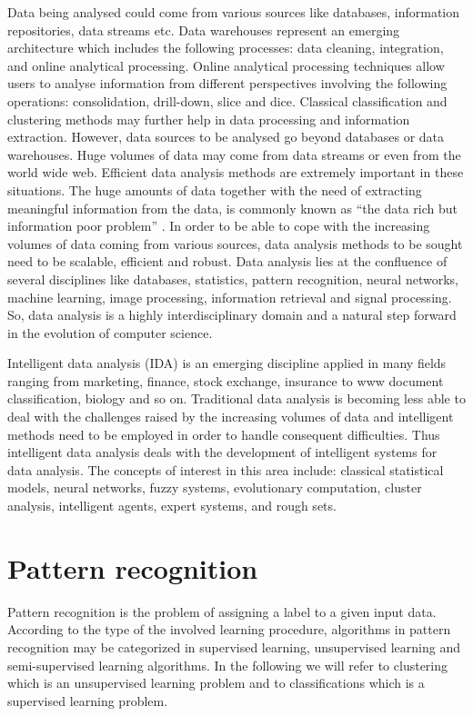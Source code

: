 Data being analysed could come from various sources like databases, information repositories, data streams etc. Data warehouses represent an emerging architecture which includes the following processes: data cleaning, integration, and online analytical processing. 
Online analytical processing techniques allow users to analyse information from different perspectives involving the following operations: consolidation, drill-down, slice and dice. Classical classification and clustering methods may further help in data processing and information extraction. 
However, data sources to be analysed go beyond databases or data warehouses. Huge volumes of data may come from data streams or even from the world wide web. Efficient data analysis methods are extremely important in these situations. The huge amounts of data together with the need of extracting meaningful information from the data, is commonly known as ``the data rich  but information poor problem'' \cite{Han06DataMining}. In order to be able to cope with the increasing volumes of data coming from various sources, data analysis methods to be sought need to be scalable, efficient and robust. Data analysis lies at the confluence of several disciplines like databases, statistics, pattern recognition, neural networks, machine learning, image processing, information retrieval and signal processing. So, data analysis is a highly interdisciplinary domain and a natural step forward in the evolution of computer science. 

Intelligent data analysis (IDA) is an emerging discipline applied in many fields \cite{website:clustering,Han06DataMining, Gaceanu11Using} ranging from  marketing, finance, stock exchange, insurance to www document classification, biology and so on. 
Traditional data analysis is becoming less able to deal with the challenges raised by the increasing volumes of data and intelligent methods need to be employed in order to handle consequent difficulties. Thus intelligent data analysis deals with the development of intelligent systems for data analysis. The concepts of interest in this area include: classical statistical models, neural networks, fuzzy systems, evolutionary computation, cluster analysis, intelligent agents, expert systems, and rough sets.


\section{Pattern recognition}
Pattern recognition is the problem of assigning a label to a given input data. 	
According to the type of the involved learning procedure, algorithms in pattern recognition may be categorized in supervised learning, unsupervised learning and semi-supervised learning algorithms. In the following we will refer to clustering which is an unsupervised learning problem and to classifications which is a supervised learning problem.

